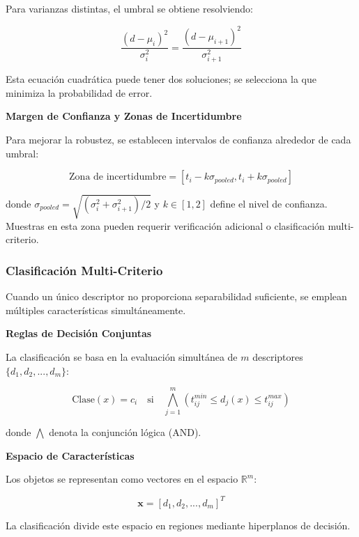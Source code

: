 Para varianzas distintas, el umbral se obtiene resolviendo:

\begin{equation}
\frac{(d-\mu_i)^2}{\sigma_i^2} = \frac{(d-\mu_{i+1})^2}{\sigma_{i+1}^2}
\end{equation}

Esta ecuación cuadrática puede tener dos soluciones; se selecciona la que minimiza la probabilidad de error.

\textbf{Margen de Confianza y Zonas de Incertidumbre}

Para mejorar la robustez, se establecen intervalos de confianza alrededor de cada umbral:

\begin{equation}
\text{Zona de incertidumbre} = [t_i - k\sigma_{pooled}, t_i + k\sigma_{pooled}]
\end{equation}

donde $\sigma_{pooled} = \sqrt{(\sigma_i^2 + \sigma_{i+1}^2)/2}$ y $k \in [1,2]$ define el nivel de confianza. Muestras en esta zona pueden requerir verificación adicional o clasificación multi-criterio.

\subsubsection{Clasificación Multi-Criterio}

Cuando un único descriptor no proporciona separabilidad suficiente, se emplean múltiples características simultáneamente.

\textbf{Reglas de Decisión Conjuntas}

La clasificación se basa en la evaluación simultánea de $m$ descriptores $\{d_1, d_2, ..., d_m\}$:

\begin{equation}
\text{Clase}(x) = c_i \quad \text{si} \quad \bigwedge_{j=1}^{m} (t_{ij}^{min} \leq d_j(x) \leq t_{ij}^{max})
\end{equation}

donde $\bigwedge$ denota la conjunción lógica (AND).

\textbf{Espacio de Características}

Los objetos se representan como vectores en el espacio $\mathbb{R}^m$:

\begin{equation}
\mathbf{x} = [d_1, d_2, ..., d_m]^T
\end{equation}

La clasificación divide este espacio en regiones mediante hiperplanos de decisión.

